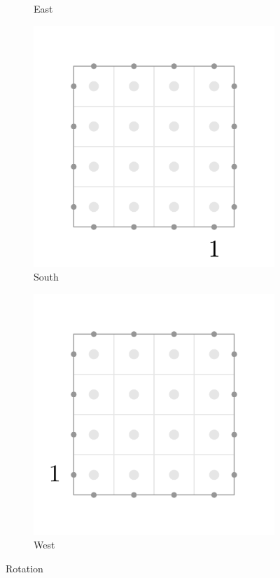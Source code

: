 \documentclass[12pt]{article}
\begin{document}
\begin{figure}[H]
\begin{subfigure}[b]{0.30\textwidth}
        \caption{East}
    \end{subfigure}
    \begin{subfigure}[b]{0.30\textwidth}
        \includegraphics[width=\textwidth]{images/south1.pdf}
        \caption{South}
    \end{subfigure}
    \begin{subfigure}[b]{0.30\textwidth}
        \includegraphics[width=\textwidth]{images/west1.pdf}
        \caption{West}
    \end{subfigure}

    \caption{Rotation}
    \label{rotation}
\end{figure}
\end{document}
